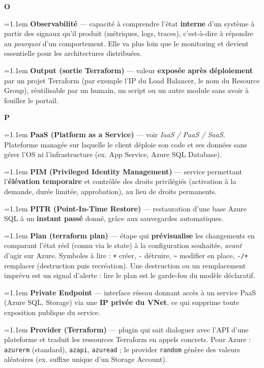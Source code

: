 \documentclass[11pt,a4paper]{article}
\newcommand{\co}[1]{\texttt{\small #1}}
\newcommand{\lettre}[1]{%
  \par\addvspace{9pt}\needspace{4.5\baselineskip}%
  \markright{#1}%
  {\noindent\sffamily\bfseries\Large\color{azure}#1}%
  \nobreak\vspace{0.4mm}{\color{azure!45}\hrule height 1pt}\nobreak\vspace{3mm}\par}
\newcommand{\df}[2]{%
  \par\addvspace{4pt}\needspace{2\baselineskip}%
  \hangindent=1.1em\hangafter=1
  {\sffamily\bfseries\color{azuredark}#1} — #2\par}
\begin{document}
\lettre{O}

\df{Observabilité}{capacité à comprendre l'état \textbf{interne} d'un système à partir des signaux qu'il produit (métriques, logs, traces), c'est-à-dire à répondre au \emph{pourquoi} d'un comportement. Elle va plus loin que le monitoring et devient essentielle pour les architectures distribuées.}

\df{Output (sortie Terraform)}{valeur \textbf{exposée après déploiement} par un projet Terraform (par exemple l'IP du Load Balancer, le nom du Resource Group), réutilisable par un humain, un script ou un autre module sans avoir à fouiller le portail.}

\lettre{P}

\df{PaaS (Platform as a Service)}{voir \emph{IaaS / PaaS / SaaS}. Plateforme managée sur laquelle le client déploie son code et ses données sans gérer l'OS ni l'infrastructure (ex. App Service, Azure SQL Database).}

\df{PIM (Privileged Identity Management)}{service permettant l'\textbf{élévation temporaire} et contrôlée des droits privilégiés (activation à la demande, durée limitée, approbation), au lieu de droits permanents.}

\df{PITR (Point-In-Time Restore)}{restauration d'une base Azure SQL à un \textbf{instant passé} donné, grâce aux sauvegardes automatiques.}

\df{Plan (terraform plan)}{étape qui \textbf{prévisualise} les changements en comparant l'état réel (connu via le state) à la configuration souhaitée, \emph{avant} d'agir sur Azure. Symboles à lire : \co{+} créer, \co{-} détruire, \co{\textasciitilde} modifier en place, \co{-/+} remplacer (destruction puis recréation). Une destruction ou un remplacement imprévu est un signal d'alerte : lire le plan est le garde-fou du modèle déclaratif.}

\df{Private Endpoint}{interface réseau donnant accès à un service PaaS (Azure SQL, Storage) via une \textbf{IP privée du VNet}, ce qui supprime toute exposition publique du service.}

\df{Provider (Terraform)}{plugin qui sait dialoguer avec l'API d'une plateforme et traduit les ressources Terraform en appels concrets. Pour Azure : \co{azurerm} (standard), \co{azapi}, \co{azuread} ; le provider \co{random} génère des valeurs aléatoires (ex. suffixe unique d'un Storage Account).}
\end{document}
